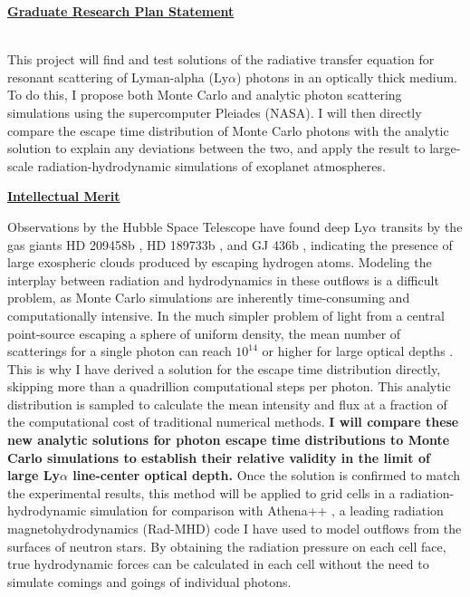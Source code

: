 \documentclass[11pt]{article}
\title{\vspace{-1.5in}}
\author{}
\date{}
\begin{document}
\maketitle

\thispagestyle{empty}
\centerline{\underline{\textbf{Graduate Research Plan Statement}}}

\noindent
\\ This project will find and test solutions of the radiative transfer equation for resonant scattering of Lyman-alpha (Ly$\alpha$) photons in an optically thick medium. To do this, I propose both Monte Carlo and analytic photon scattering simulations using the supercomputer Pleiades (NASA). I will then directly compare the escape time distribution of Monte Carlo photons with the analytic solution to explain any deviations between the two, and apply the result to large-scale radiation-hydrodynamic simulations of exoplanet atmospheres.

\noindent \textbf{\underline{Intellectual Merit}} 

Observations by the Hubble Space Telescope have found deep Ly$\alpha$ transits by the gas giants HD 209458b \cite{2003Natur.422..143V}, HD 189733b \cite{2012A&A...543L...4L}, and  GJ 436b \cite{2015Natur.522..459E}, indicating the presence of large exospheric clouds produced by escaping hydrogen atoms. Modeling the interplay between radiation and hydrodynamics in these outflows is a difficult problem, as Monte Carlo simulations are inherently time-consuming and computationally intensive. In the much simpler problem of light from a central point-source escaping a sphere of uniform density, the mean number of scatterings for a single photon can reach $10^{14}$ or higher for large optical depths \cite{ourpaper}. This is why I have derived a solution for the escape time distribution directly, skipping more than a quadrillion computational steps per photon. This analytic distribution is sampled to calculate the mean intensity and flux at a fraction of the computational cost of traditional numerical methods. \textbf{I will compare these new analytic solutions for photon escape time distributions to Monte Carlo simulations to establish their relative validity in the limit of large Ly$\alpha$ line-center optical depth.} Once the solution is confirmed to match the experimental results, this method will be applied to grid cells in a radiation-hydrodynamic simulation for comparison with Athena++ \cite{2019ascl.soft12005S}, a leading radiation magnetohydrodynamics (Rad-MHD) code I have used to model outflows from the surfaces of neutron stars. By obtaining the radiation pressure on each cell face, true hydrodynamic forces can be calculated in each cell without the need to simulate comings and goings of individual photons.
\end{document}

